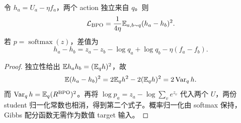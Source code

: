 \begin{proposition}[成对回归完全消去两个归一化常数]
\label{prop:quotient-pairwise}
令 $h_a=U_a-\eta f_a$，两个 action 独立来自 $q$。则
\begin{equation}
\mathcal L_{\mathrm{BPO}}=
\frac1{4\eta}\mathbb E_{a,b\sim q}(h_a-h_b)^2.
\end{equation}
若 $p=\operatorname{softmax}(z)$，差值为
\begin{equation}
h_a-h_b=z_a-z_b-\log q_a+\log q_b-\eta(f_a-f_b).
\end{equation}
\end{proposition}
\begin{proof}
独立性给出 $\mathbb E h_ah_b=(\mathbb E_qh)^2$，故
\begin{equation}
\mathbb E(h_a-h_b)^2=2\mathbb E_qh^2-2(\mathbb E_qh)^2=2\operatorname{Var}_qh.
\end{equation}
而 $\operatorname{Var}_qh=\mathbb E_q(R^{\mathrm{BPO}})^2$。再将 $\log p_a=z_a-\log\sum_v e^{z_v}$ 代入两个 $U$，两份 student 归一化常数也相消，得到第二个式子。概率归一化由 softmax 保持，Gibbs 配分函数无需作为数值 target 输入。
\end{proof}
